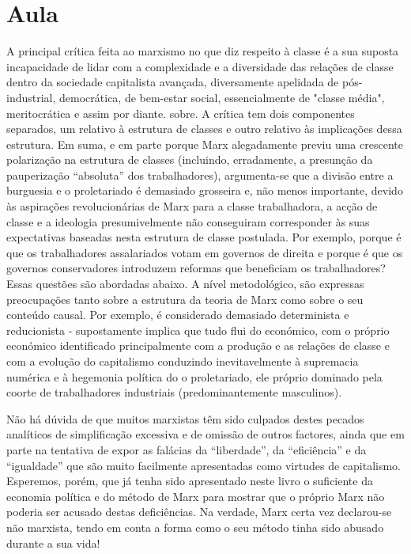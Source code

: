 \section{Aula}
 \par 
A principal crítica feita ao marxismo no que diz respeito à classe é a sua suposta incapacidade de lidar com a complexidade e a diversidade das relações de classe dentro da sociedade capitalista avançada, diversamente apelidada de pós-industrial, democrática, de bem-estar social, essencialmente de "classe média", meritocrática e assim por diante. sobre. A crítica tem dois componentes separados, um relativo à estrutura de classes e outro relativo às implicações dessa estrutura. Em suma, e em parte porque Marx alegadamente previu uma crescente polarização na estrutura de classes (incluindo, erradamente, a presunção da pauperização “absoluta” dos trabalhadores), argumenta-se que a divisão entre a burguesia e o proletariado é demasiado grosseira e, não menos importante, devido às aspirações revolucionárias de Marx para a classe trabalhadora, a acção de classe e a ideologia presumivelmente não conseguiram corresponder às suas expectativas baseadas nesta estrutura de classe postulada. Por exemplo, porque é que os trabalhadores assalariados votam em governos de direita e porque é que os governos conservadores introduzem reformas que beneficiam os trabalhadores? Essas questões são abordadas abaixo. A nível metodológico, são expressas preocupações tanto sobre a estrutura da teoria de Marx como sobre o seu conteúdo causal. Por exemplo, é considerado demasiado determinista e reducionista - supostamente implica que tudo flui do económico, com o próprio económico identificado principalmente com a produção e as relações de classe e com a evolução do capitalismo conduzindo inevitavelmente à supremacia numérica e à hegemonia política do o proletariado, ele próprio dominado pela coorte de trabalhadores industriais (predominantemente masculinos).
 \par 
Não há dúvida de que muitos marxistas têm sido culpados destes pecados analíticos de simplificação excessiva e de omissão de outros factores, ainda que em parte na tentativa de expor as falácias da “liberdade”, da “eficiência” e da “igualdade” que são muito facilmente apresentadas como virtudes de capitalismo. Esperemos, porém, que já tenha sido apresentado neste livro o suficiente da economia política e do método de Marx para mostrar que o próprio Marx não poderia ser acusado destas deficiências. Na verdade, Marx certa vez declarou-se não marxista, tendo em conta a forma como o seu método tinha sido abusado durante a sua vida!
